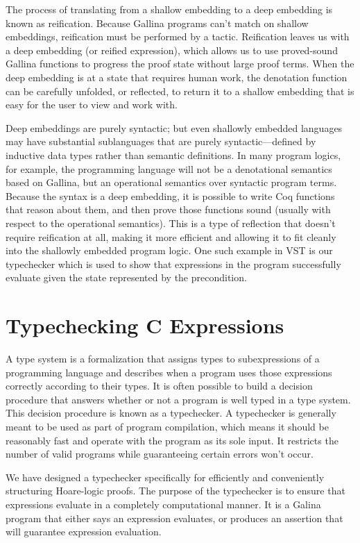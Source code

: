 \documentclass{puthesis}
\begin{document}
The process of translating from a shallow embedding to a deep
embedding is known as reification. Because Gallina programs can't
match on shallow embeddings, reification must be performed by a
tactic. Reification leaves us with a deep embedding (or reified
expression), which allows us to use proved-sound Gallina functions to
progress the proof state without large proof terms. When the deep
embedding is at a state that requires human work, the denotation
function can be carefully unfolded, or reflected, to return it to a
shallow embedding that is easy for the user to view and work with.


Deep embeddings are purely syntactic; but even shallowly embedded
languages may have substantial sublanguages that are purely
syntactic---defined by inductive data types rather than semantic
definitions. In many program logics, for example, the programming
language will not be a denotational semantics based on Gallina, but an
operational semantics over syntactic program terms. Because the syntax
is a deep embedding, it is possible to write Coq functions that reason
about them, and then prove those functions sound (usually with respect
to the operational semantics). This is a type of reflection that
doesn't require reification at all, making it more efficient and
allowing it to fit cleanly into the shallowly embedded program
logic. One such example in VST is our typechecker which is used to
show that expressions in the program successfully evaluate given the
state represented by the precondition.


\chapter{Typechecking C Expressions}
\label{ch:typechecking}


A type system is a formalization that assigns types to subexpressions
of a programming language and describes when a program uses those
expressions correctly according to their types.  It is often possible to
build a decision procedure that answers whether or not a program is
well typed in a type system. This decision procedure is known as a
typechecker.  A typechecker is generally meant to be used as part of
program compilation, which means it should be reasonably fast and
operate with the program as its sole input. It restricts the number
of valid programs while guaranteeing certain errors won't occur.

We have designed a typechecker specifically for efficiently and
conveniently structuring Hoare-logic proofs. The purpose of the
typechecker is to ensure that expressions evaluate in a completely
computational manner. It is a Galina program that either says an
expression evaluates, or produces an assertion that will guarantee
expression evaluation.
\end{document}
